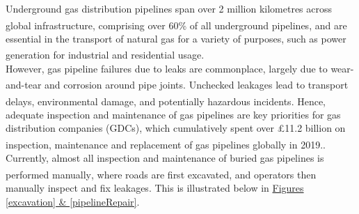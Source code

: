 \documentclass[11pt]{article}		%
\newcommand{\supercite}[1]{\textsuperscript{\cite{#1}}}		%
\begin{document}
		Underground gas distribution pipelines span over 2 million kilometres across global infrastructure, comprising over 60\% of all underground pipelines\supercite{sönnichsen_5_2021}, and are essential in the transport of natural gas for a variety of purposes, such as power generation for industrial and residential usage\supercite{group.met.com}. 
		\\
		\hspace*{3ex}However, gas pipeline failures due to leaks are commonplace, largely due to wear-and-tear and corrosion around pipe joints\supercite{corrosion1}. Unchecked leakages lead to transport delays, environmental damage, and potentially hazardous incidents\supercite{hazardousincidents}. Hence, adequate inspection and maintenance of gas pipelines are key priorities for gas distribution companies (GDCs), which cumulatively spent over £11.2 billion on inspection, maintenance  and replacement of gas pipelines globally in 2019.\supercite{ltd}. 
		\\
		\hspace*{3ex}Currently, almost all inspection and maintenance of buried gas pipelines is performed manually\supercite{manually}, where roads are first excavated, and operators then manually inspect and fix leakages. This is illustrated below in \hyperref[excavation]{Figures \ref*{excavation} \& \ref*{pipelineRepair}}.
\end{document}
